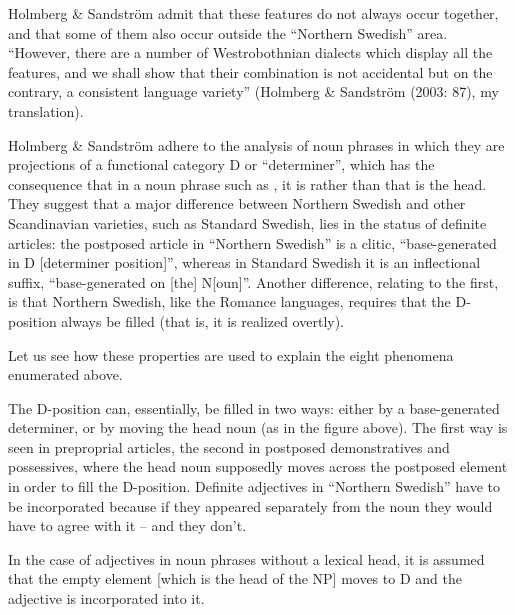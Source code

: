 Holmberg \& Sandström admit that these features do not always occur together, and that some of them also occur outside the “Northern Swedish” area. “However, there are a number of Westrobothnian dialects which display all the features, and we shall show that their combination is not accidental but on the contrary, a consistent language variety” (Holmberg \& Sandström (2003: 87), my translation).

Holmberg \& Sandström adhere to the analysis of noun phrases in which they are projections of a functional category D or “determiner”, which has the consequence that in a noun phrase such as , it is  rather than  that is the head. They suggest that a major difference between Northern Swedish and other Scandinavian varieties, such as Standard Swedish, lies in the status of definite articles: the postposed article in “Northern Swedish” is a clitic, “base-generated in D [determiner position]”, whereas in Standard Swedish it is an inflectional suffix, “base-generated on [the] N[oun]”. Another difference, relating to the first, is that Northern Swedish, like the Romance languages, requires that the D-position always be filled (that is, it is realized overtly).

Let us see how these properties are used to explain the eight phenomena enumerated above. 

The D-position can, essentially, be filled in two ways: either by a base-generated determiner, or by moving the head noun (as in the figure above). The first way is seen in preproprial articles, the second in postposed demonstratives and possessives, where the head noun supposedly moves across the postposed element in order to fill the D-position. Definite adjectives in “Northern Swedish” have to be incorporated because if they appeared separately from the noun they would have to agree with it – and they don’t. 

In the case of adjectives in noun phrases without a lexical head, it is assumed that the empty element  [which is the head of the NP] moves to D and the adjective is incorporated into it. 

